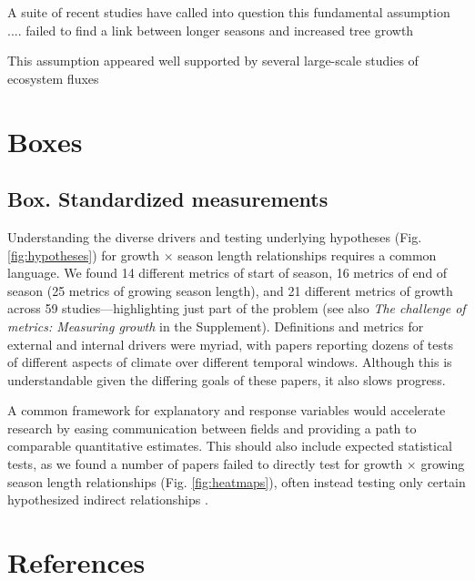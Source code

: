 \documentclass[11pt]{article}
\begin{document}
A suite of recent studies have called into question this fundamental assumption .... failed to find a link between longer seasons and increased tree growth

This assumption appeared well supported by several large-scale studies of ecosystem fluxes 
\fi


\newpage
\section{Boxes}
\subsection*{Box. Standardized measurements} %

Understanding the diverse drivers and testing underlying hypotheses (Fig. \ref{fig:hypotheses}) for growth $\times$ season length relationships requires a common language. We found 14 different metrics of start of season, 16 metrics of end of season (25 metrics of growing season length), and 21 different metrics of growth across 59 studies---highlighting just part of the problem (see also \emph{The challenge of metrics: Measuring growth} in the Supplement). Definitions and metrics for external and internal drivers were myriad, %
with papers reporting dozens of tests of different aspects of climate over different temporal windows. Although this is understandable given the differing goals of these papers, it also slows progress. 

A common framework for explanatory and response variables would accelerate research by easing communication between fields and providing a path to comparable quantitative estimates. This should also include expected statistical tests, as we found a number of papers failed to directly test for growth $\times$ growing season length relationships (Fig. \ref{fig:heatmaps}), often instead testing only certain hypothesized indirect relationships \citep[e.g. spring temperature $\times$ growth in][]{dow2022warm}. %

\clearpage
\section{References}

\end{document}
